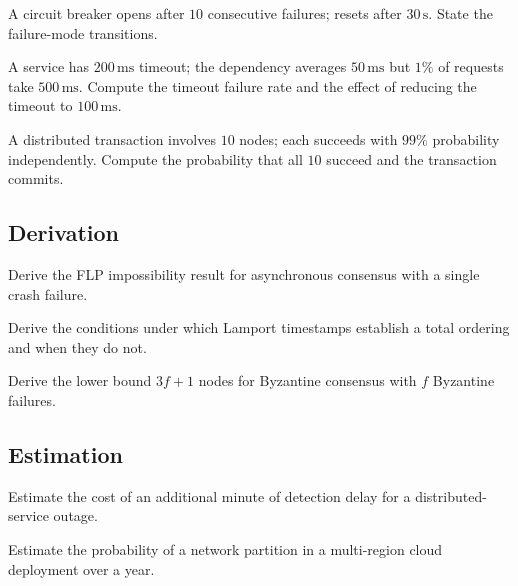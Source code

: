 \begin{exercise}
A circuit breaker opens after $10$ consecutive failures; resets after $30\,\text{s}$. State the failure-mode transitions.
\end{exercise}

\begin{exercise}
A service has $200\,\text{ms}$ timeout; the dependency averages $50\,\text{ms}$ but $1\%$ of requests take $500\,\text{ms}$. Compute the timeout failure rate and the effect of reducing the timeout to $100\,\text{ms}$.
\end{exercise}

\begin{exercise}
A distributed transaction involves $10$ nodes; each succeeds with $99\%$ probability independently. Compute the probability that all $10$ succeed and the transaction commits.
\end{exercise}

\subsection*{Derivation}

\begin{exercise}
Derive the FLP impossibility result for asynchronous consensus with a single crash failure.
\end{exercise}

\begin{exercise}
Derive the conditions under which Lamport timestamps establish a total ordering and when they do not.
\end{exercise}

\begin{exercise}
Derive the lower bound $3f+1$ nodes for Byzantine consensus with $f$ Byzantine failures.
\end{exercise}

\subsection*{Estimation}

\begin{exercise}
Estimate the cost of an additional minute of detection delay for a distributed-service outage.
\end{exercise}

\begin{exercise}
Estimate the probability of a network partition in a multi-region cloud deployment over a year.
\end{exercise}

